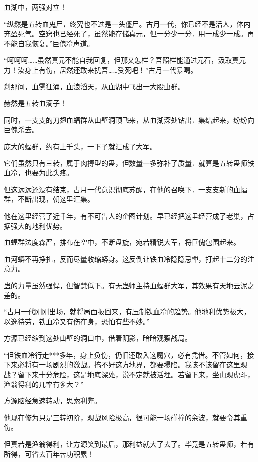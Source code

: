 
\begin{this_body}

血湖中，两强对立！

“纵然是五转血鬼尸，终究也不过是一头僵尸。古月一代，你已经不是活人，体内充盈死气。空窍也已经死了，虽然能存储真元，但一分少一分，用一成少一成。再不能自我恢复。”巨傀冷声道。

“呵呵呵……虽然真元不能自我回复，但那又怎样？吾照样能通过元石，汲取真元力！汝身上有伤，居然还敢来扰吾……受死吧！”古月一代暴喝。

刹那间，血雾狂涌，血浪滔天，从血湖中飞出一大股虫群。

赫然是五转血滴子！

同时，一支支的刀翅血蝠群从山壁洞顶飞来，从血湖深处钻出，集结起来，纷纷向巨傀杀去。

庞大的蝠群，约有上千头，一下子就汇成了大军。

它们虽然只有三转，属于肉搏型的蛊，但数量一多弥补了质量，就算是五转蛊师铁血冷，也要为此头疼。

但这远远还没有结束，古月一代意识彻底苏醒，在他的召唤下，一支支新的血蝠群，不断出现，朝这里汇集。

他在这里经营了近千年，有不可告人的企图计划。早已经把这里经营成了老巢，占据强大的地利优势。

血蝠群法度森严，排布在空中，不断盘旋，宛若精锐大军，将巨傀包围起来。

血河蟒不再挣扎，反而尽量收缩蟒身。这反倒让铁血冷隐隐忌惮，打起十二分的注意力。

蛊的力量虽然强悍，但智慧低下。有无蛊师主持血蝠群大军，其效果有天地云泥之差的。

“古月一代刚刚出场，就将局面扳回来，有压制铁血冷的趋势。他地利优势极大，以逸待劳，铁血冷又有伤在身，恐怕有些不妙。”

方源已经缩到这处山壁的洞口中，借着阴影，暗暗观察战局。

“但铁血冷行走***多年，身上负伤，仍旧还敢入这魔穴，必有凭借。不管如何，接下来必将有一场剧烈的激战。搞不好这方地界，都要塌陷。我该不该留在这里观战？留下来十分危险，这是地底深处，说不定就被活埋。若留下来，坐山观虎斗，渔翁得利的几率有多大？”

方源脑经急速转动，思索利弊。

他现在修为只是三转初阶，观战风险极高，很可能一场碰撞的余波，就要令其重伤。

但真若是渔翁得利，让方源笑到最后，那利益就大了去了。毕竟是五转蛊师，若有所得，可省去百年苦功积累！


\end{this_body}
